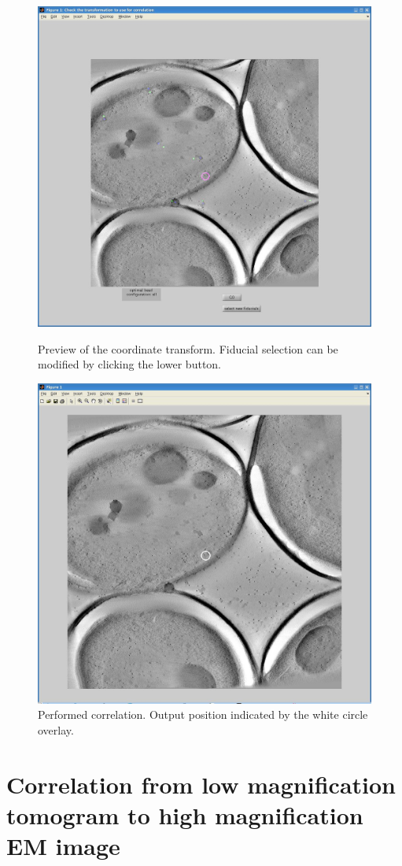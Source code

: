 \documentclass[10pt,a4paper,onepage,DIV12]{scrartcl}
\begin{document}
\begin{figure}
 \centering
 \includegraphics[width=.7\textwidth]{images/tfm_select.jpg}
 \caption{Preview of the coordinate transform. Fiducial selection can be modified by clicking the lower button.}
 \label{fig:tfm_select}

\vspace{5mm}

 \includegraphics[width=.7\textwidth]{images/tfm_appl.jpg}
 \caption{Performed correlation. Output position indicated by the white circle overlay.}
 \label{fig:tfm_appl}
\end{figure}

 \newpage
\section{Correlation from low magnification tomogram to high magnification EM image}
\end{document}
